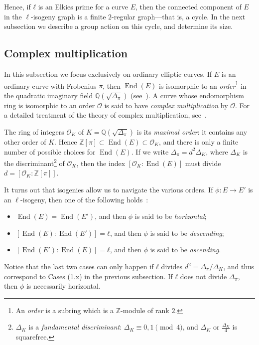 \documentclass{llncs}
\renewcommand{\O}{\mathcal{O}}
\DeclareMathOperator{\End}{End}
\begin{document}
Hence, if $ℓ$ is an Elkies prime for a curve $E$,
then the connected component of $E$ in the $\ell$-isogeny graph 
is a finite $2$-regular graph---that is, a cycle. 
In the next subsection we describe a group action on this cycle,
and determine its size.


\subsection{Complex multiplication}

In this subsection we focus exclusively on ordinary elliptic curves. 
If $E$ is an ordinary curve with Frobenius $π$,
then $\End(E)$ is isomorphic to an
\emph{order}\footnote{%
    An \emph{order} is a subring which is a $ℤ$-module of rank $2$.
} in the quadratic imaginary field
$ℚ(\sqrt{Δ_π})$ (see~\cite[III.9]{silverman:elliptic}).
A curve whose endomorphism ring is isomorphic to an order $\O$ is said to
have \emph{complex multiplication} by $\O$.
For a detailed treatment of the theory of complex multiplication,
see~\cite{lang1987elliptic,silverman:advanced}.

The ring of integers $\O_K$ of $K=ℚ(\sqrt{Δ_π})$ is its
\emph{maximal order}: it contains any other order of $K$.  Hence
$ℤ[π]⊂\End(E)⊂\O_K$, and there is only a finite number of possible
choices for $\End(E)$. If we write $Δ_π=d^2Δ_K$, where $Δ_K$ is the
discriminant\footnote{%
    $Δ_K$ is 
    a \emph{fundamental discriminant}:
    $\Delta_K\equiv0,1\pmod 4$, and $Δ_K$ or $\frac{Δ_K}{4}$ is squarefree.
} 
of $\O_K$, then the index $[\O_K:\End(E)]$ must divide $d=[\O_K:ℤ[π]]$.


It turns out that isogenies allow us to navigate the various
orders. If $ϕ:E→E'$ is an $\ell$-isogeny, then one of the following
holds~\cite[Prop.~21]{kohel}:
\begin{itemize}
\item $\End(E) = \End(E')$, and then $ϕ$ is said to be
  \emph{horizontal};
\item $[\End(E):\End(E')] = ℓ$, and then $ϕ$ is said to be
  \emph{descending};
\item $[\End(E'):\End(E)] = ℓ$, and then $ϕ$ is said to be
  \emph{ascending}.
\end{itemize}
Notice that the last two cases can only happen if $ℓ$ divides
$d^2=Δ_π/Δ_K$, and thus correspond to Cases (1.x) in the previous
subsection.
If $ℓ$ does not divide $Δ_π$, then $ϕ$ is necessarily horizontal.
\end{document}
